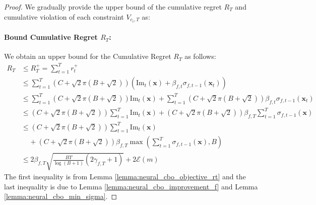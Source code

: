 \begin{proof}

We gradually provide the upper bound of the cumulative regret $R_T$ and cumulative violation of each constraint $V_{c_i,T}$ as: 
\paragraph{Bound Cumulative Regret $R_{T}$:}


\noindent We obtain an upper bound for the Cumulative Regret $R_T$ as follows:
\begin{align*}
    R_T & \le R_T^+ = \sum_{t=1}^T r_t^+
    \\
    & \le \sum_{t=1}^T \left(C + \sqrt{2}\pi(B + \sqrt{2}) \right)\left(\text{Im}_t (\mathbf{x})+ \beta_{f,t} \sigma_{f,t-1}(\mathbf{x}_t) \right)
    \\
    & \le \sum_{t=1}^T \left(C + \sqrt{2}\pi(B + \sqrt{2}) \right) \text{Im}_t (\mathbf{x}) +  \sum_{t=1}^T  \left(C + \sqrt{2}\pi(B + \sqrt{2}) \right) \beta_{f,t} \sigma_{f,t-1}(\mathbf{x}_t) 
    \\
    & \le \left(C + \sqrt{2}\pi(B + \sqrt{2}) \right) \sum_{t=1}^T \text{Im}_t (\mathbf{x}) +  \left(C + \sqrt{2}\pi(B + \sqrt{2}) \right) \beta_{f,T} \sum_{t=1}^T \sigma_{f,t-1}(\mathbf{x})
    \\
    & \le \left(C + \sqrt{2}\pi(B + \sqrt{2}) \right) \sum_{t=1}^T \text{Im}_t (\mathbf{x}) \\
    & \;\;\;\; +  \left(C + \sqrt{2}\pi(B + \sqrt{2}) \right) \beta_{f,T} \max \left(\sum_{t=1}^T \sigma_{f,t-1}(\mathbf{x}), B \right) 
    \\
    & \le 2 \beta_{f,T} \sqrt{\frac{B T}{\log(B+1)} (2\gamma_{f,T}+1)} + 2 \mathcal{E}(m)
\end{align*}
The first inequality is from Lemma \ref{lemma:neural_cbo_objective_rt} and the last inequality is due to Lemma \ref{lemma:neural_cbo_improvement_f} and Lemma \ref{lemma:neural_cbo_min_sigma}. 

\end{proof}

